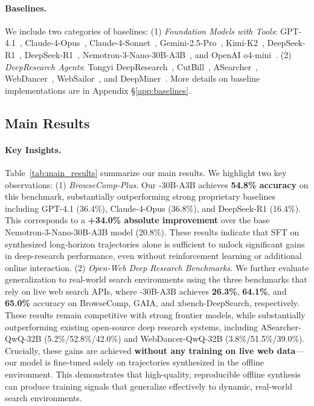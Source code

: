 \paragraph{Baselines.}
We include two categories of baselines: (1) \textit{Foundation Models with Tools}: GPT-4.1~\citep{openai2025gpt41}, Claude-4-Opus~\citep{anthropic2025claude4opus},  Claude-4-Sonnet~\citep{anthropic2025claude4opus},  Gemini-2.5-Pro~\citep{comanici2025gemini25},  Kimi-K2~\citep{team2025kimi},  DeepSeek-R1~\citep{guo2025deepseekr1},  DeepSeek-R1~\citep{liu2024deepseekv3},  Nemotron-3-Nano-30B-A3B~\citep{blakeman2025nemotron}, and OpenAI o4-mini~\citep{openai2025o4mini}. (2) \textit{DeepResearch Agents}: 
Tongyi DeepResearch~\citep{team2025tongyideepresearch},  CutBill~\citep{wu2025cutthebill}, ASearcher~\citep{gao2025Asearcher},  WebDancer~\citep{wu2025webdancer},  WebSailor~\citep{li2025websailor}, and DeepMiner~\citep{tang2025deepminer}.  More details on baseline implementations are in Appendix \S\ref{app:baselines}.

\subsection{Main Results}
\label{sec:main_results}

\paragraph{Key Insights.} Table~\ref{tab:main_results} summarize our main results. We highlight two key observations: (1) \textit{BrowseComp-Plus.} Our \model-30B-A3B achieves \textbf{54.8\% accuracy} on this benchmark, substantially outperforming strong proprietary baselines including GPT-4.1 (36.4\%), Claude-4-Opus (36.8\%), and DeepSeek-R1 (16.4\%). This corresponds to a \textbf{+34.0\% absolute improvement} over the base Nemotron-3-Nano-30B-A3B model (20.8\%). These results indicate that SFT on synthesized long-horizon trajectories alone is sufficient to unlock significant gains in deep-research performance, even without reinforcement learning or additional online interaction. (2) \textit{Open-Web Deep Research Benchmarks.} We further evaluate generalization to real-world search environments using the three benchmarks that rely on live web search APIs, where \model-30B-A3B achieves \textbf{26.3\%}, \textbf{64.1\%}, and \textbf{65.0\%} accuracy on BrowseComp, GAIA, and xbench-DeepSearch, respectively. 
These results remain competitive with strong frontier models, while substantially outperforming existing open-source deep research systems, including ASearcher-QwQ-32B (5.2\%/52.8\%/42.0\%) and WebDancer-QwQ-32B (3.8\%/51.5\%/39.0\%). 
Crucially, these gains are achieved \textbf{without any training on live web data}---our model is fine-tuned solely on trajectories synthesized in the offline environment. 
This demonstrates that high-quality, reproducible offline synthesis can produce training signals that generalize effectively to dynamic, real-world search environments.


